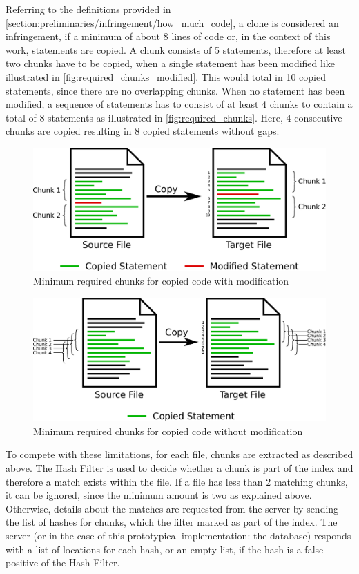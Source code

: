 Referring to the definitions provided in \autoref{section:preliminaries/infringement/how_much_code}, a clone is considered an infringement, if a minimum of about 8 lines of code or, in the context of this work, statements are copied.
A chunk consists of 5 statements, therefore at least two chunks have to be copied, when a single statement has been modified like illustrated in \autoref{fig:required_chunks_modified}.
This would total in 10 copied statements, since there are no overlapping chunks.
When no statement has been modified, a sequence of statements has to consist of at least 4 chunks to contain a total of 8 statements as illustrated in \autoref{fig:required_chunks}.
Here, 4 consecutive chunks are copied resulting in 8 copied statements without gaps.

\begin{figure}[h]
	\centering
	\includegraphics[width=0.9\linewidth]{figures/required_chunks_modified.pdf}
	\caption{Minimum required chunks for copied code with modification}\label{fig:required_chunks_modified}
\end{figure}

\begin{figure}[h]
	\centering
	\includegraphics[width=0.9\linewidth]{figures/required_chunks.pdf}
	\caption{Minimum required chunks for copied code without modification}\label{fig:required_chunks}
\end{figure}

To compete with these limitations, for each file, chunks are extracted as described above.
The Hash Filter is used to decide whether a chunk is part of the index and therefore a match exists within the file.
If a file has less than 2 matching chunks, it can be ignored, since the minimum amount is two as explained above.
Otherwise, details about the matches are requested from the server by sending the list of hashes for chunks, which the filter marked as part of the index.
The server (or in the case of this prototypical implementation: the database) responds with a list of locations for each hash, or an empty list, if the hash is a false positive of the Hash Filter.

